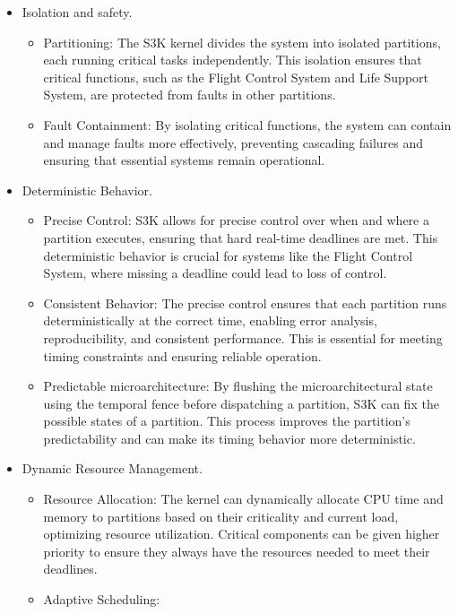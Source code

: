 \documentclass[a4paper,11pt]{article}
\begin{document}
	\begin{itemize}
		\item Isolation and safety. 

			\begin{itemize}
				\item Partitioning: 
					The S3K kernel divides the system into isolated partitions, each running critical tasks independently. 
					This isolation ensures that critical functions, such as the Flight Control System and Life Support System, are protected from faults in other partitions.
				\item Fault Containment: 
					By isolating critical functions, the system can contain and manage faults more effectively, preventing cascading failures and ensuring that essential systems remain operational.
			\end{itemize}
		\item Deterministic Behavior. 
			\begin{itemize}			
				\item Precise Control: 
					S3K allows for precise control over when and where a partition executes, ensuring that hard real-time deadlines are met. 
					This deterministic behavior is crucial for systems like the Flight Control System, where missing a deadline could lead to loss of control.
				\item Consistent Behavior: 
					The precise control ensures that each partition runs deterministically at the correct time, enabling error analysis, reproducibility, and consistent performance. 
					This is essential for meeting timing constraints and ensuring reliable operation.
				\item Predictable microarchitecture: 
					By flushing the microarchitectural state using the temporal fence before dispatching a partition, S3K can fix the possible states of a partition. 
					This process improves the partition's predictability and can make its timing behavior more deterministic.
			\end{itemize}
		\item Dynamic Resource Management. 
			\begin{itemize}
				\item Resource Allocation: 
					The kernel can dynamically allocate CPU time and memory to partitions based on their criticality and current load, optimizing resource utilization. 
					Critical components can be given higher priority to ensure they always have the resources needed to meet their deadlines.
				\item Adaptive Scheduling: 

\end{itemize}
\end{itemize}
\end{document}

